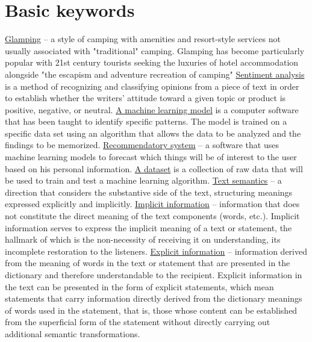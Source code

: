 \documentclass{article}
\begin{document}
\section{Basic keywords}
\underline{Glamping}  -- a style of camping with amenities and resort-style services not usually associated with "traditional" camping. Glamping has become particularly popular with 21st century tourists seeking the luxuries of hotel accommodation alongside "the escapism and adventure recreation of camping" \newline \newline
\underline{Sentiment analysis} is a method of recognizing and classifying opinions from a piece of text in order to establish whether the writers' attitude toward a given topic or product is positive, negative, or neutral.\newline\newline
\underline{A machine learning model} is a computer software that has been taught to identify specific patterns. The model is trained on a specific data set using an algorithm that allows the data to be analyzed and the findings to be memorized.\newline\newline
\underline{Recommendatory system} -- a software that uses machine learning models to forecast which things will be of interest to the user based on his personal information.\newline\newline
\underline{A dataset} is a collection of raw data that will be used to train and test a machine learning algorithm.\newline\newline
\underline{Text semantics} -- a direction that considers the substantive side of the text, structuring meanings expressed explicitly and implicitly.\newline\newline
\underline{Implicit information} -- information that does not constitute the direct meaning of the text components (words, etc.). Implicit information serves to express the implicit meaning of a text or statement, the hallmark of which is the non-necessity of receiving it on understanding, its incomplete restoration to the listeners.\newline\newline
\underline{Explicit information} -- information derived from the meaning of words in the text or statement that are presented in the dictionary and therefore understandable to the recipient. Explicit information in the text can be presented in the form of explicit statements, which mean statements that carry information directly derived from the dictionary meanings of words used in the statement, that is, those whose content can be established from the superficial form of the statement without directly carrying out additional semantic transformations.\newline\newline
\end{document}
